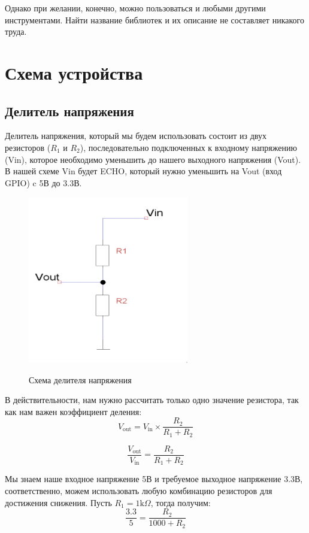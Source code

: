 \documentclass[a4paper, 14pt]{article}
\begin{document}
Однако при желании, конечно, можно пользоваться и любыми другими инструментами. Найти название библиотек и их описание не составляет никакого труда.

\newpage
\section{Схема устройства}

\subsection{Делитель напряжения}

Делитель напряжения, который мы будем использовать состоит из двух резисторов ($R_1$ и $R_2$), последовательно подключенных к входному напряжению (Vin), которое необходимо уменьшить до нашего выходного напряжения (Vout). В нашей схеме Vin будет ECHO, который нужно уменьшить на Vout (вход GPIO) c 5В до 3.3В.

\begin{figure}[H]
	\centering
	\includegraphics[width=7cm]{screenshots/2.png}\\
	\caption{Схема делителя напряжения}
\end{figure}

В действительности, нам нужно рассчитать только одно значение резистора, так как нам важен коэффициент деления:
$$V_\text{out} = V_\text{in} \times \frac{R_2}{R_1 + R_2}$$

$$\frac{V_\text{out}}{V_\text{in}} = \frac{R_2}{R_1+R_2}$$

Мы знаем наше входное напряжение 5В и требуемое выходное напряжение 3.3В, соответственно, можем использовать любую комбинацию резисторов для достижения снижения. Пусть $R_1 = 1\text{k}\Omega$, тогда получим:
$$\frac{3.3}{5}=\frac{R_2}{1000+R_2}$$
\end{document}
